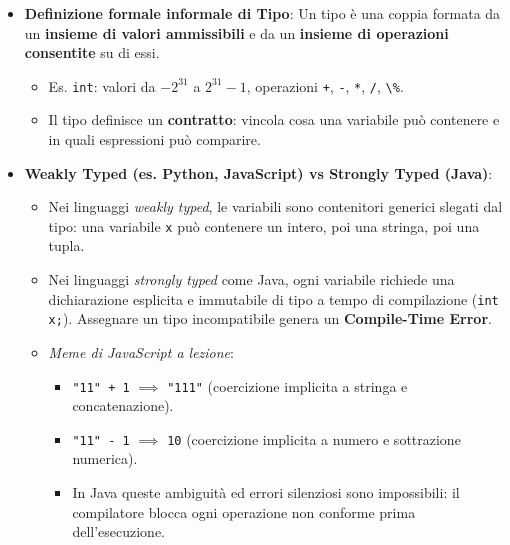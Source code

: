\documentclass[11pt,a4paper]{article}
\newcommand{\passthrough}[1]{#1}
\providecommand{\tightlist}{\setlength{\itemsep}{0pt}\setlength{\parskip}{0pt}}
\begin{document}
\begin{itemize}
\tightlist
\item
  \textbf{Definizione formale informale di Tipo}: Un tipo è una coppia
  formata da un \textbf{insieme di valori ammissibili} e da un
  \textbf{insieme di operazioni consentite} su di essi.

  \begin{itemize}
  \tightlist
  \item
    Es. \passthrough{\lstinline!int!}: valori da \(-2^{31}\) a
    \(2^{31}-1\), operazioni \passthrough{\lstinline!+!},
    \passthrough{\lstinline!-!}, \passthrough{\lstinline!*!},
    \passthrough{\lstinline!/!}, \passthrough{\lstinline!\%!}.
  \item
    Il tipo definisce un \textbf{contratto}: vincola cosa una variabile
    può contenere e in quali espressioni può comparire.
  \end{itemize}
\item
  \textbf{Weakly Typed (es. Python, JavaScript) vs Strongly Typed
  (Java)}:

  \begin{itemize}
  \tightlist
  \item
    Nei linguaggi \emph{weakly typed}, le variabili sono contenitori
    generici slegati dal tipo: una variabile \passthrough{\lstinline!x!}
    può contenere un intero, poi una stringa, poi una tupla.
  \item
    Nei linguaggi \emph{strongly typed} come Java, ogni variabile
    richiede una dichiarazione esplicita e immutabile di tipo a tempo di
    compilazione (\passthrough{\lstinline!int x;!}). Assegnare un tipo
    incompatibile genera un \textbf{Compile-Time Error}.
  \item
    \emph{Meme di JavaScript a lezione}:

    \begin{itemize}
    \tightlist
    \item
      \passthrough{\lstinline!"11" + 1!} \(\implies\)
      \passthrough{\lstinline!"111"!} (coercizione implicita a stringa e
      concatenazione).
    \item
      \passthrough{\lstinline!"11" - 1!} \(\implies\)
      \passthrough{\lstinline!10!} (coercizione implicita a numero e
      sottrazione numerica).
    \item
      In Java queste ambiguità ed errori silenziosi sono impossibili: il
      compilatore blocca ogni operazione non conforme prima
      dell'esecuzione.
    \end{itemize}
  \end{itemize}
\end{itemize}
\end{document}
